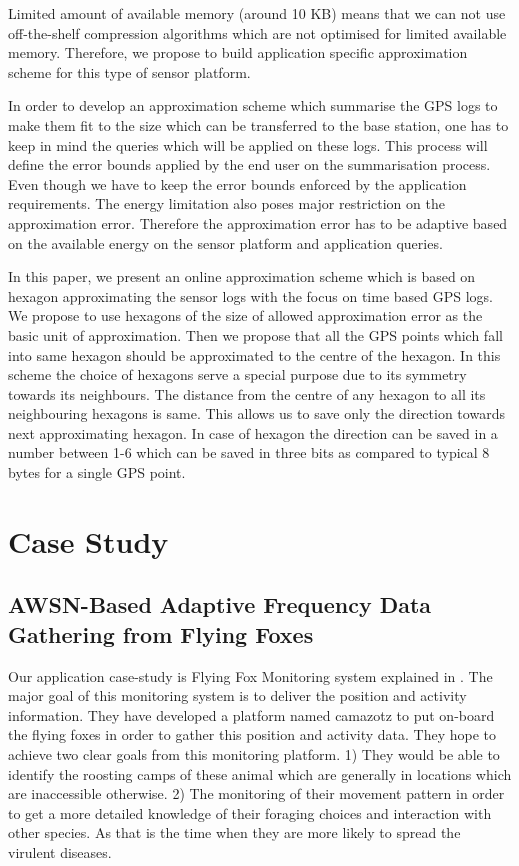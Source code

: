 \documentclass[conference]{IEEEtran}
\begin{document}
Limited amount of available memory (around 10 KB) means that we can not use off-the-shelf compression 
algorithms which are not optimised for limited available memory. Therefore, we propose to build 
application specific approximation scheme for this type of sensor platform.\

In order to develop an approximation scheme which summarise the GPS logs to make them fit to the 
size which can be transferred to the base station, one has to keep in mind the queries which will 
be applied on these logs. This process will define the error bounds applied by the end user on the 
summarisation process. Even though we have to keep the error bounds enforced by the application 
requirements. The energy limitation also poses major restriction on the approximation error. Therefore 
the approximation error has to be adaptive based on the available energy on the sensor platform and 
application queries.

In this paper, we present an online approximation scheme which is based on hexagon approximating 
the sensor logs with the focus on time based GPS logs. We propose to use hexagons of the size of 
allowed approximation error as the basic unit of approximation. Then we propose that all the GPS 
points which fall into same hexagon should be approximated to the centre of the hexagon. In this 
scheme the choice of hexagons serve a special purpose due to its symmetry towards its neighbours. 
The distance from the centre of any hexagon to all its neighbouring hexagons is same. This allows 
us to save only the direction towards next approximating hexagon. In case of hexagon the direction 
can be saved in a number between 1-6 which can be saved in three bits as compared to typical 8 bytes 
for a single GPS point.

\section{Case Study}
\subsection{AWSN-Based Adaptive Frequency Data Gathering from Flying Foxes} \label{case-study}
Our application case-study is Flying Fox Monitoring system explained in \cite{raja-ipsn}. 
The major goal of this monitoring system is to deliver the position and activity information. 
They have developed a platform named camazotz to put on-board the flying foxes in order to 
gather this position and activity data. They hope to achieve two clear goals from this monitoring 
platform. 1) They would be able to identify the roosting camps of these animal which are 
generally in locations which are inaccessible otherwise. 2) The monitoring of their movement 
pattern in order to get a more detailed knowledge of their foraging choices and interaction 
with other species. As that is the time when they are more likely to spread the virulent diseases.\
\end{document}
